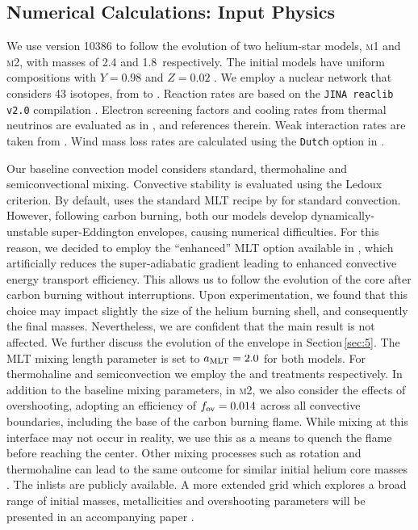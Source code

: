 \documentclass[twocolumn,tighten,times]{aastex62}
\begin{document}
\subsection{Numerical Calculations: Input Physics}\label{sec:2.1}
We use \mesa version 10386 to follow the evolution of two helium-star models, \textsc{m1} and \textsc{m2}, with  masses of  2.4 and 1.8\msun\ respectively. 
The initial models have uniform compositions with $Y=0.98$ and $Z=0.02$ \citep[solar abundances are taken from ][]{grevesse1998}. We employ a nuclear network that considers 43  isotopes, from  to . Reaction rates are based on the \texttt{JINA reaclib v2.0} compilation \citep{cyburt2010}. Electron screening factors and cooling rates from thermal neutrinos are evaluated as in \cite{Farmer:2015afs}, and references therein. 
Weak interaction rates are taken from \cite{Suzuki:2015iry}. 
Wind mass loss rates are calculated using the \texttt{Dutch} option in \mesa  \citep{Paxton:2013pj}. 

Our baseline convection model considers standard, thermohaline and semiconvectional mixing. Convective stability is 
evaluated using the Ledoux criterion. By default, \mesa uses the standard MLT recipe by  \cite{cox1968} for standard
convection. However, following carbon burning, both our models develop 
dynamically-unstable super-Eddington envelopes, causing numerical 
difficulties. For this reason, we decided to employ the ``enhanced'' MLT 
option available in \mesa \citep{Paxton:2013pj}, which artificially reduces 
the super-adiabatic gradient leading to  enhanced convective energy 
transport efficiency.  This  allows us to follow the evolution of the core 
after carbon burning without interruptions. Upon experimentation, we found 
that this choice may impact slightly the size of the helium burning shell, 
and consequently the final masses. Nevertheless, we are confident that the 
main result is not affected. We further discuss the evolution of the 
envelope in Section\,\ref{sec:5}. 
The MLT mixing length parameter is set to $a_{\rm MLT}=2.0$ for both models. For thermohaline and semiconvection we employ the \cite{kippenhahn1980} and \cite{langer1983} treatments respectively. 
In addition to the baseline mixing parameters, in \textsc{m2}, we also 
consider the effects of overshooting, adopting an efficiency of $f_{\rm ov}=0.014$ across all convective boundaries, including the base of the 
carbon burning flame. While mixing at this interface may not occur in reality, 
we use this as a means to  quench the flame before reaching the center.  
Other mixing processes such as rotation and thermohaline can lead to the 
same outcome for similar initial helium core masses \citep{Farmer:2015afs}.
The \mesa inlists are publicly available.
A more extended grid which explores a broad range of initial masses, 
metallicities and overshooting parameters will be presented in an 
accompanying paper \citep{chanlaridis2019}.       
\end{document}
